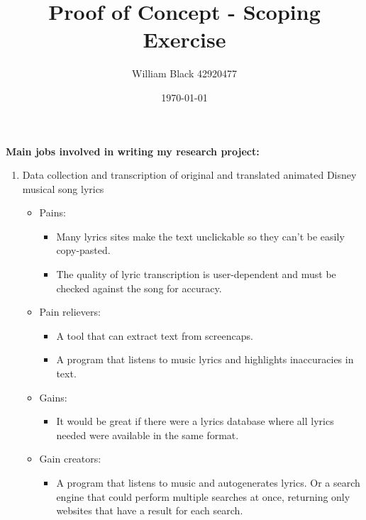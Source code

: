 \documentclass[12pt]{article}
\title{\textbf{Proof of Concept - Scoping Exercise}}
\date{\today}
\author{William Black 42920477}
\begin{document}
 
\maketitle \textbf{\large{Main jobs involved in writing my research project:}}
\begin{enumerate}

    \item Data collection and transcription of original and translated animated Disney musical song lyrics
    \begin{itemize}
        \renewcommand{\labelitemi}{$\clock$}
        \renewcommand{\labelitemii}{$\cdot$}
        \item Pains:
        \begin{itemize}
            \item Many lyrics sites make the text unclickable so they can't be easily copy-pasted. 
            \item The quality of lyric transcription is user-dependent and must be checked against the song for accuracy.
        \end{itemize}
        \renewcommand{\labelitemi}{$\sun$}
        \item Pain relievers:
        \begin{itemize}
            \item A tool that can extract text from screencaps.
            \item A program that listens to music lyrics and highlights inaccuracies in text. 
        \end{itemize}
        \renewcommand{\labelitemi}{$\smiley$}    
        \item Gains:
        \begin{itemize}
            \item It would be great if there were a lyrics database where all lyrics needed were available in the same format.
        \end{itemize}
        \renewcommand{\labelitemi}{$\blacksmiley$}
        \item Gain creators:
        \begin{itemize}
            \item A program that listens to music and autogenerates lyrics. Or a search engine that could perform multiple searches at once, returning only websites that have a result for each search.
        \end{itemize}
    \end{itemize}
    

\end{enumerate}
\end{document}
